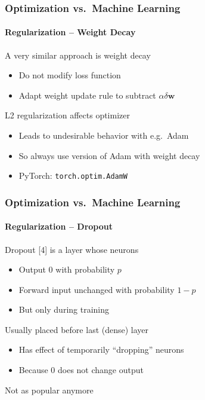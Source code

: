 \documentclass[xetex,professionalfont]{beamer}
\renewcommand\emph[1]{\textcolor{tuwcvl_cvl_blue}{#1}}
\renewcommand{\vec}[1]{\ensuremath{\mathbf{#1}}}
\newcommand{\vw}{\vec{w}}
\begin{document}
\begin{frame}
	\frametitle{Optimization vs.~Machine Learning}
	\framesubtitle{Regularization -- Weight Decay}

	A very similar approach is \emph{weight decay}
	\begin{itemize}
		\item Do not modify loss function
		\item Adapt weight update rule to subtract $\alpha\delta\vw$
	\end{itemize}

	\bigskip

	L2 regularization affects optimizer %
	\begin{itemize}
		\item Leads to undesirable behavior with e.g.~Adam %
		\item So always use version of Adam with weight decay
		\item PyTorch: \texttt{torch.optim.AdamW} %
	\end{itemize}

\end{frame}


\begin{frame}
	\frametitle{Optimization vs.~Machine Learning}
	\framesubtitle{Regularization -- Dropout}

	\emph{Dropout} [4] is a layer whose neurons
	\begin{itemize}
		\item Output $0$ with probability $p$
		\item Forward input unchanged with probability $1-p$
		\item But only during training
	\end{itemize}

	\bigskip

	Usually placed before last (dense) layer
	\begin{itemize}
		\item Has effect of temporarily \enquote{dropping} neurons
		\item Because $0$ does not change output %
	\end{itemize}

	\bigskip

	Not as popular anymore %

\end{frame}
\end{document}
